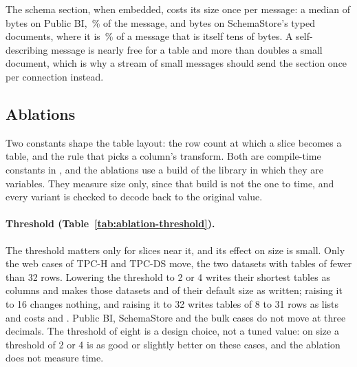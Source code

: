 The schema section, when embedded, costs its size once per message: a
median of  bytes on Public BI,
\,\% of the message, and
 bytes on SchemaStore's
typed documents, where it is \,\%
of a message that is itself tens of bytes. A self-describing message is
nearly free for a table and more than doubles a small document, which is
why a stream of small messages should send the section once per connection
instead.

\FloatBarrier
\subsection{Ablations}
\label{sec:ablations}

Two constants shape the table layout: the row count at which a slice
becomes a table, and the rule that picks a column's transform. Both are
compile-time constants in \colbin{}, and the ablations use a build of the
library in which they are variables. They measure size only, since that
build is not the one to time, and every variant is checked to decode back to
the original value.

\begin{table}[t]
\centering\footnotesize
{}
\caption{Table threshold: \colbin{}'s size with the threshold at 2, 4, 16
and 32 rows over its size at the default of 8, as written and under gzip
(geometric mean over cases).}
\label{tab:ablation-threshold}
\end{table}

\paragraph{Threshold (Table~\ref{tab:ablation-threshold}).} The threshold
matters only for slices near it, and its effect on size is small. Only the
web cases of TPC-H and TPC-DS move, the two datasets with tables of fewer
than 32 rows. Lowering the threshold to 2 or 4 writes their shortest tables
as columns and makes those datasets
 and
 of their default size as
written; raising it to 16 changes nothing, and raising it to 32 writes
tables of 8 to 31 rows as lists and costs
 and
. Public BI, SchemaStore and the
bulk cases do not move at three decimals. The threshold of
eight is a design choice, not a tuned value: on size a threshold of 2 or 4
is as good or slightly better on these cases, and the ablation does not
measure time.

